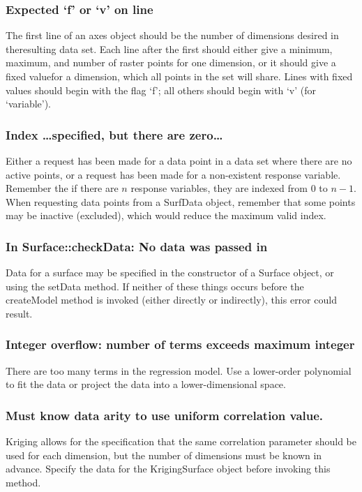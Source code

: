 \documentclass{article}
\begin{document}
\subsubsection{Expected `f' or `v' on line}
The first line of an axes object should be the number of dimensions desired in
theresulting data set.  Each line after the first should either give a minimum,
maximum, and number of raster points for one dimension, or it should give a
fixed valuefor a dimension, which all points in the set will share.  Lines with
fixed values should begin with the flag `f'; all others should begin with `v'
(for `variable').
\subsubsection{Index \ldots specified, but there are zero\ldots}
Either a request has been made for a data point in a data set where there are no
active points, or a request has been made for a non-existent response variable.
Remember the if there are $n$ response variables, they are indexed from $0$ to
$n-1$.  When requesting data points from a SurfData object, remember that some
points may be inactive (excluded), which would reduce the maximum valid index.

\subsubsection{In Surface::checkData: No data was passed in}
Data for a surface may be specified in the constructor of a Surface object, or
using the setData method.  If neither of these things occurs before the
createModel method is invoked (either directly or indirectly), this error could
result.

\subsubsection{Integer overflow: number of terms exceeds maximum integer}
There are too many terms in the regression model.  Use a lower-order polynomial
to fit the data or project the data into a lower-dimensional space.

\subsubsection{Must know data arity to use uniform correlation value.}
Kriging allows for the specification that the same correlation parameter should
be used for each dimension, but the number of dimensions must be known in
advance.  Specify the data for the KrigingSurface object before invoking this
method.
\end{document}
